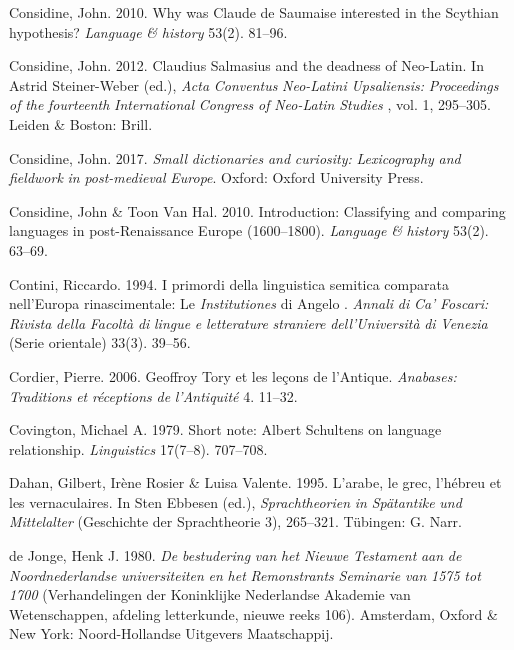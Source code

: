 \documentclass[output=paper]{langsci/langscibook}
\begin{document}
Considine, John. 2010. Why was Claude de Saumaise interested in the Scythian hypothesis? \textit{Language} \textit{\&} \textit{history} 53(2). 81–96.

Considine, John. 2012. Claudius Salmasius and the deadness of Neo-Latin. In Astrid Steiner-Weber (ed.), \textit{Acta} \textit{Conventus} \textit{Neo-Latini} \textit{Upsaliensis:} \textit{Proceedings} \textit{of} \textit{the} \textit{fourteenth} \textit{International} \textit{Congress} \textit{of} \textit{Neo-Latin} \textit{Studies} \textit{\citep{Uppsala2009}}, vol. 1, 295–305. Leiden \& Boston: Brill.

Considine, John. 2017. \textit{Small} \textit{dictionaries} \textit{and} \textit{curiosity:} \textit{Lexicography} \textit{and} \textit{fieldwork} \textit{in} \textit{post-medieval} \textit{Europe}. Oxford: Oxford University Press.

Considine, John \& Toon Van Hal. 2010. Introduction: Classifying and comparing languages in post-Renaissance Europe (1600–1800). \textit{Language} \textit{\&} \textit{history} 53(2). 63–69.

Contini, Riccardo. 1994. I primordi della linguistica semitica comparata nell’Europa rinascimentale: Le \textit{Institutiones} di Angelo \citet{Canini1554}. \textit{Annali} \textit{di} \textit{Ca’} \textit{Foscari:} \textit{Rivista} \textit{della} \textit{Facoltà} \textit{di} \textit{lingue} \textit{e} \textit{letterature} \textit{straniere} \textit{dell’Università} \textit{di} \textit{Venezia} (Serie orientale) 33(3). 39–56.

Cordier, Pierre. 2006. Geoffroy Tory et les leçons de l’Antique. \textit{Anabases:} \textit{Traditions} \textit{et} \textit{réceptions} \textit{de} \textit{l’Antiquité} 4. 11–32.

Covington, Michael A. 1979. Short note: Albert Schultens on language relationship. \textit{Linguistics} 17(7–8). 707–708.

Dahan, Gilbert, Irène Rosier \& Luisa Valente. 1995. L’arabe, le grec, l’hébreu et les vernaculaires. In Sten Ebbesen (ed.), \textit{Sprachtheorien} \textit{in} \textit{Spätantike} \textit{und} \textit{Mittelalter} (Geschichte der Sprachtheorie 3), 265–321. Tübingen: G. Narr.

de Jonge, Henk J. 1980. \textit{De} \textit{bestudering} \textit{van} \textit{het} \textit{Nieuwe} \textit{Testament} \textit{aan} \textit{de} \textit{Noordnederlandse} \textit{universiteiten} \textit{en} \textit{het} \textit{Remonstrants} \textit{Seminarie} \textit{van} \textit{1575} \textit{tot} \textit{1700} (Verhandelingen der Koninklijke Nederlandse Akademie van Wetenschappen, afdeling letterkunde, nieuwe reeks 106). Amsterdam, Oxford \& New York: Noord-Hollandse Uitgevers Maatschappij.
\end{document}
